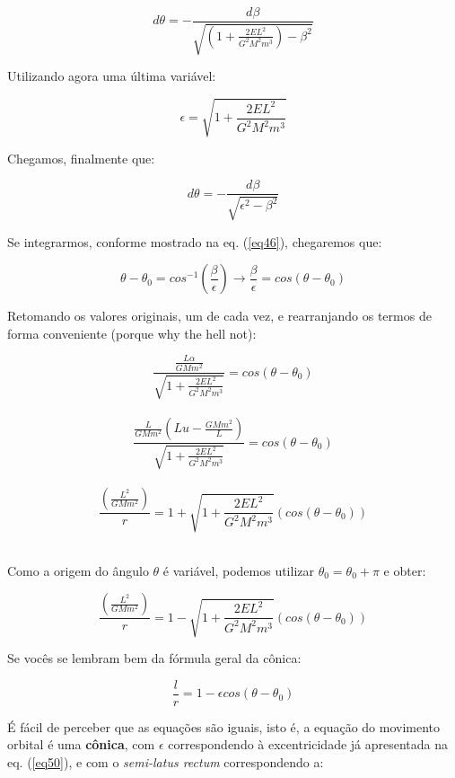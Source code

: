 \begin{equation}
	d\theta = -\frac{d\beta}{\sqrt{\left(1 + \frac{2EL^2}{G^2M^2m^3}\right) - \beta^2}}
	\label{eq49}
\end{equation}

Utilizando agora uma última variável:

\begin{equation}
	\epsilon = \sqrt{1 + \frac{2EL^2}{G^2M^2m^3}}
	\label{eq50}
\end{equation}

Chegamos, finalmente que:

\begin{equation}
	d\theta = -\frac{d\beta}{\sqrt{\epsilon^2 - \beta^2}} \label{eq51}
\end{equation}

Se integrarmos, conforme mostrado na eq. (\ref{eq46}), chegaremos que:

\begin{equation}
	\theta - \theta_0 = cos^{-1}\left(\frac{\beta}{\epsilon}\right) \rightarrow \frac{\beta}{\epsilon} = cos(\theta - \theta_0)
	\label{eq52}
\end{equation}

Retomando os valores originais, um de cada vez, e rearranjando os termos de forma conveniente (porque why the hell not):

\[
	\frac{\frac{L\alpha}{GMm^2}}{\sqrt{1 + \frac{2EL^2}{G^2M^2m^3}}} =  cos(\theta - \theta_0)
\] {\\}
\[
	\frac{\frac{L}{GMm^2}\left(Lu-\frac{GMm^2}{L}\right)}{\sqrt{1 + \frac{2EL^2}{G^2M^2m^3}}} =  cos(\theta - \theta_0)
\] {\\}
\[
	\frac{\left(\frac{L^2}{GMm^2}\right)}{r} = 1 + \sqrt{1 + \frac{2EL^2}{G^2M^2m^3}}(cos(\theta - \theta_0))
\]{\\}

Como a origem do ângulo $\theta$ é variável, podemos utilizar $\theta_0 = \theta_0 + \pi$ e obter:

\begin{equation}
	\frac{\left(\frac{L^2}{GMm^2}\right)}{r} = 1 - \sqrt{1 + \frac{2EL^2}{G^2M^2m^3}}(cos(\theta - \theta_0))
	\label{eq53}
\end{equation}

Se vocês se lembram bem da fórmula geral da cônica:

\[
	\frac{l}{r} = 1-\epsilon cos(\theta - \theta_0)
\] 

É fácil de perceber que as equações são iguais, isto é, a equação do movimento orbital é uma \textbf{cônica}, com $\epsilon$ correspondendo à excentricidade já apresentada na eq. (\ref{eq50}), e com o \textit{semi-latus rectum} correspondendo a:

